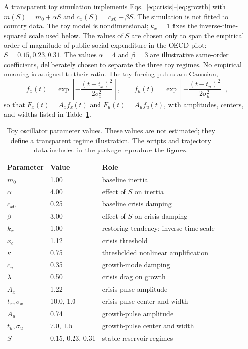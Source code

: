 \documentclass[11pt]{article}
\begin{document}
\label{sec:toy}
A transparent toy simulation implements Eqs.~\eqref{eq:crisis}--\eqref{eq:growth} with $m(S)=m_0+\alpha S$ and $c_x(S)=c_{x0}+\beta S$. The simulation is not fitted to country data. The toy model is nondimensional; $k_x=1$ fixes the inverse-time-squared scale used below. The values of $S$ are chosen only to span the empirical order of magnitude of public social expenditure in the OECD pilot: $S=0.15,0.23,0.31$. The values $\alpha=4$ and $\beta=3$ are illustrative same-order coefficients, deliberately chosen to separate the three toy regimes. No empirical meaning is assigned to their ratio. The toy forcing pulses are Gaussian,
\[
f_x(t)=\exp\left[-\frac{(t-t_x)^2}{2\sigma_x^2}\right],
\qquad
f_u(t)=\exp\left[-\frac{(t-t_u)^2}{2\sigma_u^2}\right],
\]
so that $F_x(t)=A_x f_x(t)$ and $F_u(t)=A_u f_u(t)$, with amplitudes, centers, and widths listed in Table~\ref{tab:toyparams}.

\begin{table}[H]
\centering
\caption{Toy oscillator parameter values. These values are not estimated; they define a transparent regime illustration. The scripts and trajectory data included in the package reproduce the figures.}
\label{tab:toyparams}
\begin{tabular}{lll}
\toprule
Parameter & Value & Role \\
\midrule
$m_0$ & 1.00 & baseline inertia \\
$\alpha$ & 4.00 & effect of $S$ on inertia \\
$c_{x0}$ & 0.25 & baseline crisis damping \\
$\beta$ & 3.00 & effect of $S$ on crisis damping \\
$k_x$ & 1.00 & restoring tendency; inverse-time scale \\
$x_c$ & 1.12 & crisis threshold \\
$\kappa$ & 0.75 & thresholded nonlinear amplification \\
$c_u$ & 0.35 & growth-mode damping \\
$\lambda$ & 0.50 & crisis drag on growth \\
$A_x$ & 1.22 & crisis-pulse amplitude \\
$t_x,\sigma_x$ & 10.0, 1.0 & crisis-pulse center and width \\
$A_u$ & 0.74 & growth-pulse amplitude \\
$t_u,\sigma_u$ & 7.0, 1.5 & growth-pulse center and width \\
$S$ & 0.15, 0.23, 0.31 & stable-reservoir regimes \\
\bottomrule
\end{tabular}
\end{table}
\end{document}
